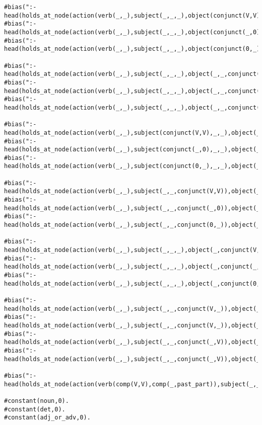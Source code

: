 \begin{lstlisting}
#bias(":- head(holds_at_node(action(verb(_,_),subject(_,_,_),object(conjunct(V,V),_,_)),var__(1))).").
#bias(":- head(holds_at_node(action(verb(_,_),subject(_,_,_),object(conjunct(_,0),_,_)),var__(1))).").
#bias(":- head(holds_at_node(action(verb(_,_),subject(_,_,_),object(conjunct(0,_),_,_)),var__(1))).").

#bias(":- head(holds_at_node(action(verb(_,_),subject(_,_,_),object(_,_,conjunct(V,V))),var__(1))).").
#bias(":- head(holds_at_node(action(verb(_,_),subject(_,_,_),object(_,_,conjunct(_,0))),var__(1))).").
#bias(":- head(holds_at_node(action(verb(_,_),subject(_,_,_),object(_,_,conjunct(0,_))),var__(1))).").

#bias(":- head(holds_at_node(action(verb(_,_),subject(conjunct(V,V),_,_),object(_,_,_)),var__(1))).").
#bias(":- head(holds_at_node(action(verb(_,_),subject(conjunct(_,0),_,_),object(_,_,_)),var__(1))).").
#bias(":- head(holds_at_node(action(verb(_,_),subject(conjunct(0,_),_,_),object(_,_,_)),var__(1))).").

#bias(":- head(holds_at_node(action(verb(_,_),subject(_,_,conjunct(V,V)),object(_,_,_)),var__(1))).").
#bias(":- head(holds_at_node(action(verb(_,_),subject(_,_,conjunct(_,0)),object(_,_,_)),var__(1))).").
#bias(":- head(holds_at_node(action(verb(_,_),subject(_,_,conjunct(0,_)),object(_,_,_)),var__(1))).").

#bias(":- head(holds_at_node(action(verb(_,_),subject(_,_,_),object(_,conjunct(V,V),_)),var__(1))).").
#bias(":- head(holds_at_node(action(verb(_,_),subject(_,_,_),object(_,conjunct(_,0),_)),var__(1))).").
#bias(":- head(holds_at_node(action(verb(_,_),subject(_,_,_),object(_,conjunct(0,_),_)),var__(1))).").

#bias(":- head(holds_at_node(action(verb(_,_),subject(_,_,conjunct(V,_)),object(_,_,conjunct(V,_))),var__(1))).").
#bias(":- head(holds_at_node(action(verb(_,_),subject(_,_,conjunct(V,_)),object(_,_,conjunct(_,V))),var__(1))).").
#bias(":- head(holds_at_node(action(verb(_,_),subject(_,_,conjunct(_,V)),object(_,_,conjunct(V,_))),var__(1))).").
#bias(":- head(holds_at_node(action(verb(_,_),subject(_,_,conjunct(_,V)),object(_,_,conjunct(_,V))),var__(1))).").

#bias(":- head(holds_at_node(action(verb(comp(V,V),comp(_,past_part)),subject(_,_,_),object(0,0,0)),var__(1))).").

#constant(noun,0).
#constant(det,0).
#constant(adj_or_adv,0).
\end{lstlisting}

\vspace{5pt}

